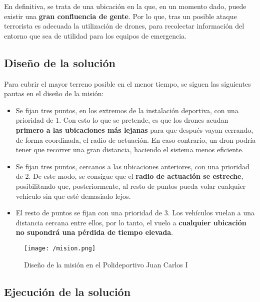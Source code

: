 En definitiva, se trata de una ubicación en la que, en un momento dado, puede existir una \textbf{gran confluencia de gente}. Por lo que, tras un posible ataque terrorista es adecuada la utilización de drones, para recolectar información del entorno que sea de utilidad para los equipos de emergencia.

\subsection{Diseño de la solución}

Para cubrir el mayor terreno posible en el menor tiempo, se siguen las siguientes pautas en el diseño de la misión:

\begin{itemize}
\item Se fijan tres puntos, en los extremos de la instalación deportiva, con una prioridad de 1. Con esto lo que se pretende, es que los drones acudan \textbf{primero a las ubicaciones más lejanas} para que después vayan cerrando, de forma coordinada, el radio de actuación. En caso contrario, un dron podría tener que recorrer una gran distancia, haciendo el sistema menos eficiente.
\item Se fijan tres puntos, cercanos a las ubicaciones anteriores, con una prioridad de 2. De este modo, se consigue que el \textbf{radio de actuación se estreche}, posibilitando que, posteriormente, al resto de puntos pueda volar cualquier vehículo sin que esté demasiado lejos.
\item El resto de puntos se fijan con una prioridad de 3. Los vehículos vuelan a una distancia cercana entre ellos, por lo tanto, el vuelo a \textbf{cualquier ubicación no supondrá una pérdida de tiempo elevada}.
\end{itemize}

\clearpage

\begin{figure}[!h]
\begin{center}
\texttt{[image: /mision.png]}
\caption[Diseño de la misión en el Polideportivo Juan Carlos I]{Diseño de la misión en el Polideportivo Juan Carlos I}
\label{fig:mision}
\end{center}
\end{figure}

\subsection{Ejecución de la solución}

